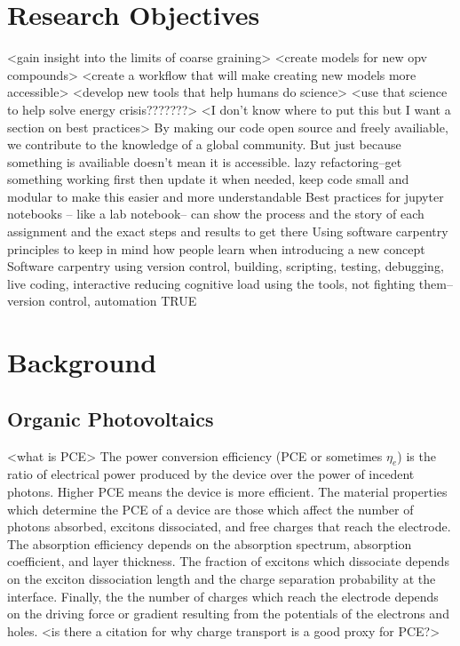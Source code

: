 \section*{Research Objectives}

<gain insight into the limits of coarse graining>
<create models for new opv compounds>
<create a workflow that will make creating new models more accessible>
<develop new tools that help humans do science>
<use that science to help solve energy crisis???????>
<I don't know where to put this but I want a section on best practices>
By making our code open source and freely availiable, we contribute to the knowledge of a global community. But just because something is availiable doesn't mean it is accessible. 
lazy refactoring--get something working first then update it when needed, keep code small and modular to make this easier and more understandable\cite{Adorf2018a} 
Best practices for jupyter notebooks -- like a lab notebook-- can show the process and the story of each assignment and the exact steps and results to get there\cite{Rule2019a}
Using software carpentry principles to keep in mind how people learn when introducing a new concept\cite{https://v4.software-carpentry.org/softeng/principles.html}
Software carpentry using version control, building, scripting, testing, debugging,\cite{Wilson2006}
live coding, interactive \cite{Wilson2016}
reducing cognitive load \cite{Jankowski2019}
using the tools, not fighting them--version control, automation \cite{Wilson2014}
TRUE\cite{Thompson2020}

\section*{Background}

\subsection*{Organic Photovoltaics}

<what is PCE>
The power conversion efficiency (PCE or sometimes $\eta_{e}$) is the ratio of electrical power produced by the device over the power of incedent photons.
Higher PCE means the device is more efficient.  
The material properties which determine the PCE of a device are those which affect the number of photons absorbed, excitons dissociated, and free charges that reach the electrode.
The absorption efficiency depends on the absorption spectrum, absorption coefficient, and layer thickness.
The fraction of excitons which dissociate depends on the exciton dissociation length and the charge separation probability at the interface.
Finally, the the number of charges which reach the electrode depends on the driving force or gradient resulting from the potentials of the electrons and holes.\cite{Hoppe2004}
<is there a citation for why charge transport is a good proxy for PCE?>

